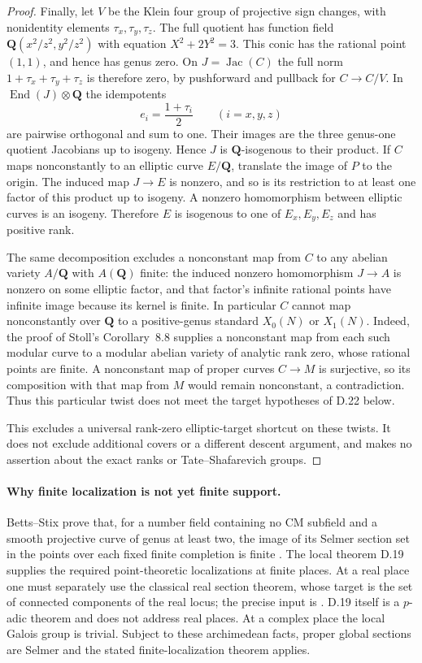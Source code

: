 \begin{proof}
Finally, let $V$ be the Klein four group of projective sign changes,
with nonidentity elements $\tau_x,\tau_y,\tau_z$. The full quotient
has function field $\mathbf Q(x^2/z^2,y^2/z^2)$ with equation
$X^2+2Y^2=3$. This conic has the rational point $(1,1)$, and hence has
genus zero. On $J=\operatorname{Jac}(C)$ the full norm
$1+\tau_x+\tau_y+\tau_z$ is therefore zero, by pushforward and pullback
for $C\to C/V$. In $\operatorname{End}(J)\otimes\mathbf Q$ the
idempotents
\[
 e_i=\frac{1+\tau_i}{2}\qquad(i=x,y,z)
\]
are pairwise orthogonal and sum to one. Their images are the three
genus-one quotient Jacobians up to isogeny. Hence $J$ is
$\mathbf Q$-isogenous to their product. If $C$ maps nonconstantly to
an elliptic curve $E/\mathbf Q$, translate the image of $P$ to the
origin. The induced map $J\to E$ is nonzero, and so is its restriction
to at least one factor of this product up to isogeny. A nonzero
homomorphism between elliptic curves is an isogeny. Therefore $E$ is
isogenous to one of $E_x,E_y,E_z$ and has positive rank.

The same decomposition excludes a nonconstant map from $C$ to any
abelian variety $A/\mathbf Q$ with $A(\mathbf Q)$ finite: the induced
nonzero homomorphism $J\to A$ is nonzero on some elliptic factor, and
that factor's infinite rational points have infinite image because
its kernel is finite. In particular $C$ cannot map nonconstantly over
$\mathbf Q$ to a positive-genus standard $X_0(N)$ or $X_1(N)$.
Indeed, the proof of Stoll's Corollary~8.8 \cite{D_Stoll2007} supplies
a nonconstant map from each such modular curve to a modular abelian
variety of analytic rank zero, whose rational points are finite.
A nonconstant map of proper curves $C\to M$ is surjective, so its
composition with that map from $M$ would remain nonconstant, a
contradiction. Thus this particular twist does not meet the target
hypotheses of D.22 below.

This excludes a universal rank-zero elliptic-target shortcut on these
twists. It does not exclude additional covers or a different descent
argument, and makes no assertion about the exact ranks or
Tate--Shafarevich groups.
\end{proof}

\paragraph{Why finite localization is not yet finite support.}
Betts--Stix prove that, for a number field containing no CM subfield
and a smooth projective curve of genus at least two, the image of its
Selmer section set in the points over each fixed finite completion is
finite \cite[Theorem~A]{D_BettsStix2025}. The local theorem D.19 supplies
the required point-theoretic localizations at finite places. At a real
place one must separately use the classical real section theorem,
whose target is the set of connected components of the real locus;
the precise input is \cite[Corollary~3.13]{D_Mochizuki2003Real}.
D.19 itself is a $p$-adic theorem and does not address real places.
At a complex place the local Galois group is trivial. Subject to these
archimedean facts, proper global sections are Selmer and the stated
finite-localization theorem applies.

